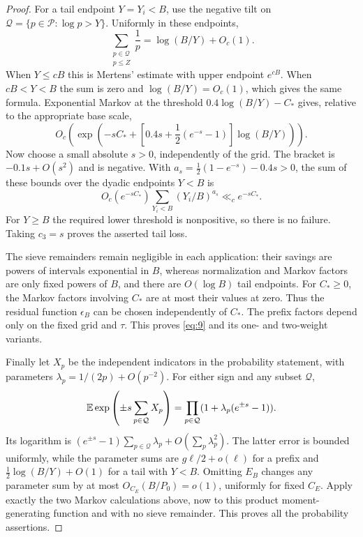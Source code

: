 \begin{proof}
For a tail endpoint $Y=Y_i<B$, use the negative tilt on
$\mathcal Q=\{p\in\mathcal P:\log p>Y\}$.  Uniformly in these endpoints,
\[
 \sum_{\substack{p\in\mathcal Q\\p\le Z}}\frac1p
                  =\log(B/Y)+O_c(1).
\]
When $Y\le cB$ this is Mertens' estimate with upper endpoint $e^{cB}$.
When $cB<Y<B$ the sum is zero and $\log(B/Y)=O_c(1)$, which gives the same
formula.  Exponential Markov at the threshold
$0.4\log(B/Y)-C_*$ gives, relative to the appropriate base scale,
\[
 O_c\left(\exp\left(-sC_*+
       \left[0.4s+\frac12(e^{-s}-1)\right]\log(B/Y)\right)\right).
\]
Now choose a small absolute $s>0$, independently of the grid.  The bracket
is $-0.1s+O(s^2)$ and is negative.  With
$a_s=\frac12(1-e^{-s})-0.4s>0$, the sum of these bounds over the dyadic
endpoints $Y<B$ is
\[
 O_c(e^{-sC_*})\sum_{Y_i<B}(Y_i/B)^{a_s}
                         \ll_c e^{-sC_*}.
\]
For $Y\ge B$ the required lower threshold is nonpositive, so there is no
failure.  Taking $c_3=s$ proves the asserted tail loss.

The sieve remainders remain negligible in each application: their savings
are powers of intervals exponential in $B$, whereas normalization and
Markov factors are only fixed powers of $B$, and there are $O(\log B)$
tail endpoints.  For $C_*\ge0$, the Markov factors involving $C_*$ are at
most their values at zero.  Thus the residual function $\epsilon_B$ can
be chosen independently of $C_*$.  The prefix factors depend only on the
fixed grid and $\tau$.  This proves \eqref{eq:9} and its one- and two-weight
variants.

Finally let $X_p$ be the independent indicators in the probability
statement, with parameters $\lambda_p=1/(2p)+O(p^{-2})$.
For either sign and any subset $\mathcal Q$,
\[
 \mathbb E\exp\left(\pm s\sum_{p\in\mathcal Q}X_p\right)
 =\prod_{p\in\mathcal Q}(1+\lambda_p(e^{\pm s}-1)).
\]
Its logarithm is
$(e^{\pm s}-1)\sum_{p\in\mathcal Q}\lambda_p+O(\sum_p\lambda_p^2)$.
The latter error is bounded uniformly, while the parameter sums are
$g\ell/2+o(\ell)$ for a prefix and
$\tfrac12\log(B/Y)+O(1)$ for a tail with $Y<B$.
Omitting $E_B$ changes any parameter sum by at most
$O_{C_E}(B/P_0)=o(1)$, uniformly for fixed $C_E$.  Apply exactly the two
Markov calculations above, now to this product moment-generating function
and with no sieve remainder.  This
proves all the probability assertions.
\end{proof}
